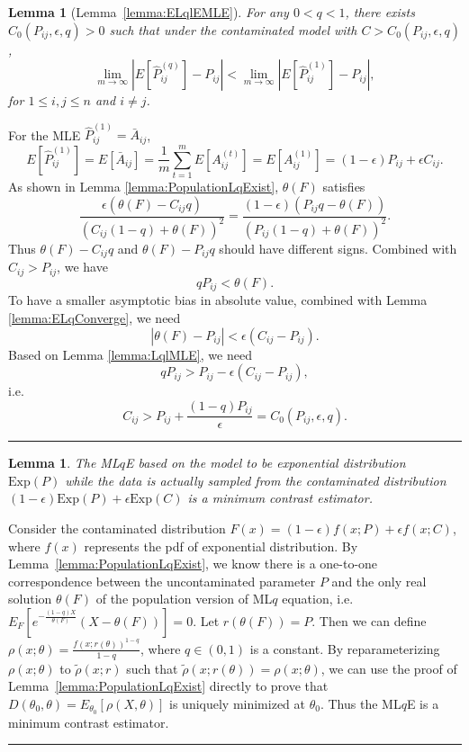 \documentclass[a4paper]{article}
\newenvironment{proof}{{\bf Proof:  }}{\hfill\rule{2mm}{2mm}}
\newtheorem{lemma}[fact]{Lemma}
\renewcommand{\hat}{\widehat}
\begin{document}
\begin{lemma}[Lemma~\ref{lemma:ELqlEMLE}]
\label{lemma:ELqlEMLEproof}
For any $0 < q < 1$, there exists $C_0(P_{ij}, \epsilon, q) > 0$ such that under the contaminated model with $C > C_0(P_{ij}, \epsilon, q)$,
\[
	\lim_{m \to \infty} \left| E[\hat{P}^{(q)}_{ij}] - P_{ij} \right| < 
    \lim_{m \to \infty} \left| E[\hat{P}^{(1)}_{ij}] - P_{ij} \right|,
\]
for $1 \le i, j \le n$ and $i \ne j$.
\end{lemma}
\begin{proof}
For the MLE $\hat{P}^{(1)}_{ij} = \bar{A}_{ij}$,
\[
	E[\hat{P}^{(1)}_{ij}] = E[\bar{A}_{ij}]
    = \frac{1}{m} \sum_{t = 1}^m E[A_{ij}^{(t)}]
    = E[A_{ij}^{(1)}]
    = (1-\epsilon) P_{ij} + \epsilon C_{ij}.
\]
As shown in Lemma \ref{lemma:PopulationLqExist}, $\theta(F)$ satisfies
\[
\frac{\epsilon (\theta(F) - C_{ij}q)}{(C_{ij}(1-q) + \theta(F))^2} =
\frac{(1-\epsilon) (P_{ij} q - \theta(F))}{(P_{ij}(1-q) + \theta(F))^2}.
\]
Thus $\theta(F) - C_{ij} q$ and $\theta(F) - P_{ij} q$ should have different signs. Combined with $C_{ij} > P_{ij}$, we have
\[
q P_{ij} < \theta(F).
\]
To have a smaller asymptotic bias in absolute value, combined with Lemma \ref{lemma:ELqConverge}, we need
\[
|\theta(F) - P_{ij}| < \epsilon (C_{ij} - P_{ij}).
\]
Based on Lemma \ref{lemma:LqlMLE}, we need
\[
q P_{ij} > P_{ij} - \epsilon(C_{ij} - P_{ij}),
\]
i.e.
\[
C_{ij} > P_{ij} + \frac{(1-q) P_{ij}}{\epsilon} = C_0(P_{ij}, \epsilon, q).
\]
\end{proof}


\begin{lemma}
\label{lemma:minimumcontrast}
The ML$q$E based on the model to be exponential distribution $\mathrm{Exp}(P)$ while the data is actually sampled from the contaminated distribution $(1-\epsilon) \mathrm{Exp}(P) + \epsilon \mathrm{Exp}(C)$ is a minimum contrast estimator.
\end{lemma}
\begin{proof}
Consider the contaminated distribution $F(x) = (1-\epsilon) f(x; P) + \epsilon f(x; C)$, where $f(x)$ represents the pdf of exponential distribution. By Lemma~\ref{lemma:PopulationLqExist}, we know there is a one-to-one correspondence between the uncontaminated parameter $P$ and the only real solution $\theta(F)$ of the population version of ML$q$ equation,
i.e. $E_F[e^{-\frac{(1-q)X}{\theta(F)}}(X - \theta(F))] = 0$. Let $r(\theta(F)) = P$.
Then we can define $\rho(x; \theta) = \frac{f(x; r(\theta))^{1-q}}{1 - q}$, where $q \in (0, 1)$ is a constant.
By reparameterizing $\rho(x; \theta)$ to $\widetilde{\rho}(x; r)$ such that $\widetilde{\rho}(x; r(\theta)) = \rho(x; \theta)$, we can use the proof of Lemma~\ref{lemma:PopulationLqExist} directly to prove that $D(\theta_0, \theta) = E_{\theta_0}[\rho(X, \theta)]$ is uniquely minimized at $\theta_0$. Thus the ML$q$E is a minimum contrast estimator.
\end{proof}
\end{document}
